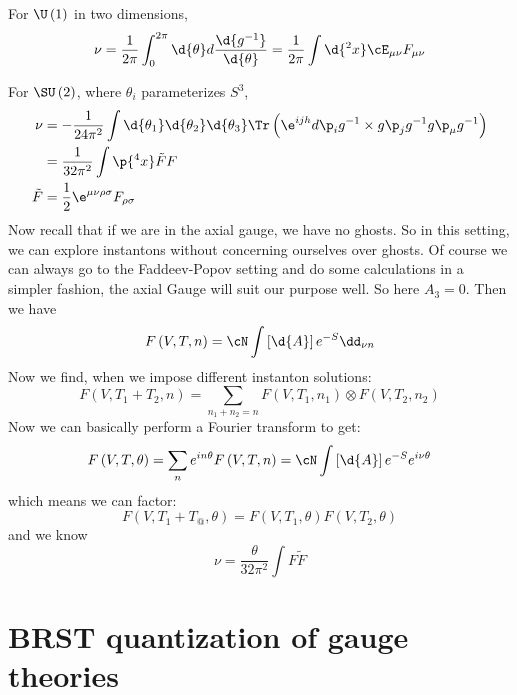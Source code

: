 \documentclass{booc}
\begin{document}
For $\U\left( 1 \right)$ in two dimensions, 
\begin{equation}
\nu = \frac{1}{2\pi} \int_0^{2\pi} \d{\theta} d\frac{\d{g^{-1}}}{\d{\theta}} = 
\frac{1}{2\pi} \int \d{^2 x} \cE_{\mu\nu}F_{\mu\nu}
\end{equation}

For $\SU\left( 2 \right)$, where $\theta_i$ parameterizes $S^3$, 
\begin{align}
\nu &= -\frac{1}{24\pi^2} \int \d{\theta_1}
\d{\theta_2} \d{\theta_3} \Tr\left( \e^{ijh} d \p_i g^{-1}\times
g \p_j g^{-1} g \p_\mu g^{-1}\right) \\
&= \frac{1}{32 \pi^2} \int \p{^4 x} \tilde F F
\\
\tilde F &= \frac{1}{2} \e^{\mu\nu \rho \sigma} F_{\rho \sigma}
\end{align}
Now recall that if we are in the axial gauge, we have no ghosts. 
So in this setting, we can explore instantons without concerning ourselves over ghosts. 
Of course we can always go to the  Faddeev-Popov setting and do some calculations in a simpler fashion,
the axial Gauge will suit our purpose well.
So here $A_3 = 0$. 
Then we have
\begin{equation}
F\left( V , T , n \right) = \cN \int \left[ \d{A} \right] e^{-S} \dd_{\nu n}
\end{equation}
Now we find, when we impose different instanton  solutions:
\begin{equation}
F\left( V , T_1 + T_2 , n \right) = 
\sum_{n_1 + n_2 = n} F\left( V , T_1 , n_1 \right)\otimes F\left(V , T_2 , n_2 \right)
\end{equation}
Now we can basically perform a Fourier transform to get:
\begin{equation}
F\left( V , T , \theta \right) = \sum_n e^{in\theta} F\left( V, T , n \right) = 
\cN \int \left[ \d{A} \right] e^{-S} e^{i\nu\theta}
\end{equation}
which means we can factor:
\begin{equation}
F\left( V , T_1 + T_@ , \theta \right) = 
F\left( V , T_1 , \theta \right)F\left( V , T_2 ,\theta \right)
\end{equation}
and we know
\begin{equation}
\nu = \frac{\theta}{32 \pi^2} \int F \tilde F
\end{equation}

\section{BRST quantization of gauge theories}
\end{document}
